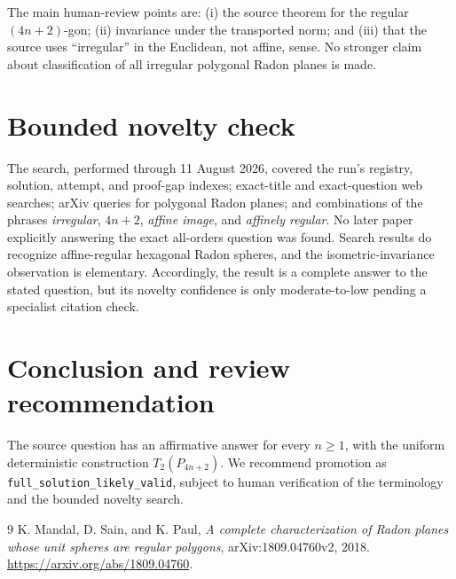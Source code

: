 \documentclass[11pt]{article}
\begin{document}
The main human-review points are: (i) the source theorem for the regular
$(4n+2)$-gon; (ii) invariance under the transported norm; and (iii) that the
source uses ``irregular'' in the Euclidean, not affine, sense.  No stronger
claim about classification of all irregular polygonal Radon planes is made.

\section{Bounded novelty check}

The search, performed through 11 August 2026, covered the run's registry,
solution, attempt, and proof-gap indexes; exact-title and exact-question web
searches; arXiv queries for polygonal Radon planes; and combinations of the
phrases \emph{irregular}, \emph{$4n+2$}, \emph{affine image}, and
\emph{affinely regular}.  No later paper explicitly answering the exact
all-orders question was found.  Search results do recognize affine-regular
hexagonal Radon spheres, and the isometric-invariance observation is
elementary.  Accordingly, the result is a complete answer to the stated
question, but its novelty confidence is only moderate-to-low pending a
specialist citation check.

\section{Conclusion and review recommendation}

The source question has an affirmative answer for every $n\geq1$, with the
uniform deterministic construction $T_2(P_{4n+2})$.  We recommend promotion as
\texttt{full\_solution\_likely\_valid}, subject to human verification of the
terminology and the bounded novelty search.

\begin{thebibliography}{9}
K. Mandal, D. Sain, and K. Paul,
\emph{A complete characterization of Radon planes whose unit spheres are regular polygons},
arXiv:1809.04760v2, 2018.
\url{https://arxiv.org/abs/1809.04760}.
\end{thebibliography}
\end{document}
